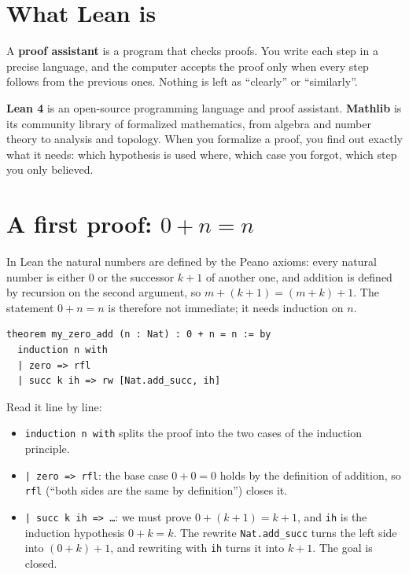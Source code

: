 \documentclass[11pt]{article}
\begin{document}

\section{What Lean is}
A \textbf{proof assistant} is a program that checks proofs. You write each step
in a precise language, and the computer accepts the proof only when every step
follows from the previous ones. Nothing is left as ``clearly'' or ``similarly''.

\textbf{Lean 4} is an open-source programming language and proof assistant.
\textbf{Mathlib} is its community library of formalized mathematics, from
algebra and number theory to analysis and topology. When you formalize a proof,
you find out exactly what it needs: which hypothesis is used where, which case
you forgot, which step you only believed.

\section{A first proof: $0 + n = n$}
In Lean the natural numbers are defined by the Peano axioms: every natural
number is either $0$ or the successor $k + 1$ of another one, and addition is
defined by recursion on the second argument, so $m + (k+1) = (m + k) + 1$. The
statement $0 + n = n$ is therefore not immediate; it needs induction on $n$.

\begin{lstlisting}
theorem my_zero_add (n : Nat) : 0 + n = n := by
  induction n with
  | zero => rfl
  | succ k ih => rw [Nat.add_succ, ih]
\end{lstlisting}

Read it line by line:
\begin{itemize}
  \item \texttt{induction n with} splits the proof into the two cases of the
    induction principle.
  \item \texttt{| zero => rfl}: the base case $0 + 0 = 0$ holds by the
    definition of addition, so \texttt{rfl} (``both sides are the same by
    definition'') closes it.
  \item \texttt{| succ k ih => \dots}: we must prove $0 + (k+1) = k + 1$, and
    \texttt{ih} is the induction hypothesis $0 + k = k$. The rewrite
    \texttt{Nat.add\_succ} turns the left side into $(0 + k) + 1$, and
    rewriting with \texttt{ih} turns it into $k + 1$. The goal is closed.
\end{itemize}
\end{document}
